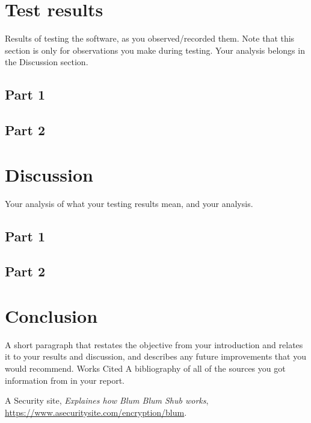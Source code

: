 \documentclass[12pt, letterpaper]{article}
\begin{document}
\section*{Test results}
Results of testing the software, as you observed/recorded them. Note that this section is only for
observations you make during testing. Your analysis belongs in the Discussion section.
\subsection*{Part 1}

\subsection*{Part 2}

\section*{Discussion}
Your analysis of what your testing results mean, and your analysis.
\subsection*{Part 1}

\subsection*{Part 2}

\section*{Conclusion}
A short paragraph that restates the objective from your introduction and relates it to your results
and discussion, and describes any future improvements that you would recommend. Works Cited A
bibliography of all of the sources you got information from in your report.

\newpage
\begin{thebibliography}{10} 
 A Security site,  \emph{Explaines how Blum Blum Shub works},
\url{https://www.asecuritysite.com/encryption/blum}.
\end{thebibliography}
\end{document}
